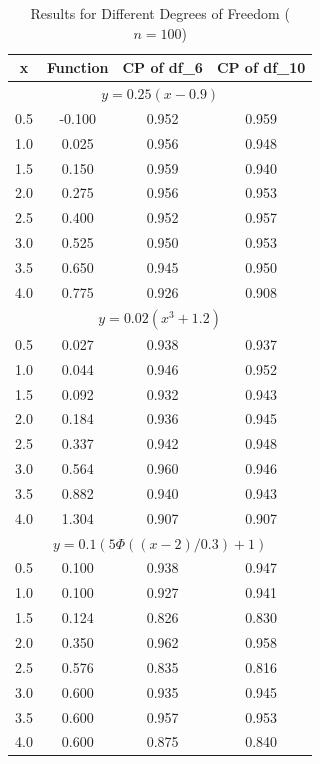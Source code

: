 \documentclass[12pt]{article}
\begin{document}
\begin{table}[ht]
  \centering
  \caption{Results for Different Degrees of Freedom (\(n = 100\))}
  \label{Table1}
  \begin{tabular}{|c|c|c|c|}
    \hline
    \textbf{x} & \textbf{Function} & \textbf{CP of df\_6} & \textbf{CP of df\_10} \\
    \hline
    \multicolumn{4}{|c|}{\(y = 0.25(x - 0.9)\)} \\
    \hline
    0.5 & -0.100 & 0.952 & 0.959 \\
    \hline
    1.0 & 0.025 & 0.956 & 0.948 \\
    \hline
    1.5 & 0.150 & 0.959 & 0.940\\
    \hline
    2.0 & 0.275 & 0.956 & 0.953 \\
    \hline
    2.5 & 0.400 & 0.952 & 0.957 \\
    \hline
    3.0 & 0.525 & 0.950 & 0.953 \\
    \hline
    3.5 & 0.650 & 0.945 & 0.950 \\
    \hline
    4.0 & 0.775 & 0.926 & 0.908 \\
    \hline
    \multicolumn{4}{|c|}{\(y = 0.02(x^3+1.2)\)} \\
    \hline
    0.5 & 0.027 & 0.938 & 0.937 \\
    \hline
    1.0 & 0.044 & 0.946 & 0.952 \\
    \hline
    1.5 & 0.092 & 0.932 & 0.943 \\
    \hline
    2.0 & 0.184 & 0.936 & 0.945 \\
    \hline
    2.5 & 0.337 & 0.942 & 0.948 \\
    \hline
    3.0 & 0.564 & 0.960 & 0.946 \\
    \hline
    3.5 & 0.882 & 0.940 & 0.943 \\
    \hline
    4.0 & 1.304 & 0.907 & 0.907 \\
    \hline
    \multicolumn{4}{|c|}{\(y = 0.1 (5\Phi((x - 2) / 0.3) + 1)\)} \\
    \hline
    0.5 & 0.100 & 0.938 & 0.947 \\
    \hline
    1.0 & 0.100 & 0.927 & 0.941 \\
    \hline
    1.5 & 0.124 & 0.826 & 0.830 \\
    \hline
    2.0 & 0.350 & 0.962 & 0.958 \\
    \hline
    2.5 & 0.576 & 0.835 & 0.816 \\
    \hline
    3.0 & 0.600 & 0.935 & 0.945 \\
    \hline
    3.5 & 0.600 & 0.957 & 0.953 \\
    \hline
    4.0 & 0.600 & 0.875 & 0.840 \\
    \hline
  \end{tabular}
\end{table}
\end{document}
